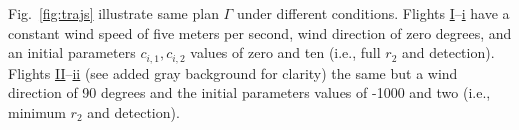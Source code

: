 \documentclass[letterpaper,10pt,journal,twoside]{IEEEtran}
\newcommand{\figpath}{./figures}
\theoremstyle{definition}
\begin{document}
%  
%  
%  


Fig.~\ref{fig:trajs} illustrate same plan $\Gamma$ under different conditions. Flights \hyperref[fig:trajs-I-static]{I}--\hyperref[fig:trajs-dyn-i]{i} have a constant wind speed of five meters per second, wind direction of zero degrees, and an initial parameters $c_{i,1},c_{i,2}$ values of zero and ten (i.e., full $r_2$ and detection). Flights \hyperref[fig:trajs-II-static]{II}--\hyperref[fig:trajs-dyn-ii]{ii} (see added gray background for clarity) the same but a wind direction of 90 degrees and the initial parameters values of -1000 and two (i.e., minimum $r_2$ and detection). 
\end{document}
